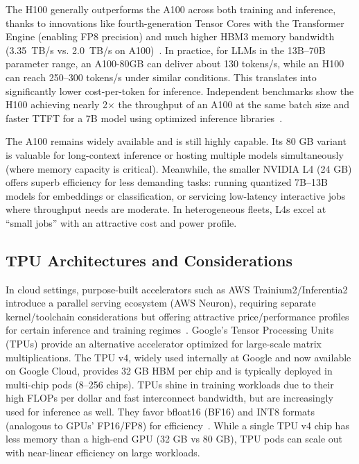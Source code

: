 The H100 generally outperforms the A100 across both training and inference, thanks to innovations like fourth-generation Tensor Cores with the Transformer Engine (enabling FP8 precision) and much higher HBM3 memory bandwidth (3.35~TB/s vs. 2.0~TB/s on A100)~\cite{nvidia-h100-arch,nvidia-a100-arch}. In practice, for LLMs in the 13B–70B parameter range, an A100-80GB can deliver about 130 tokens/s, while an H100 can reach 250–300 tokens/s under similar conditions. This translates into significantly lower cost-per-token for inference. Independent benchmarks show the H100 achieving nearly 2$\times$ the throughput of an A100 at the same batch size and faster TTFT for a 7B model using optimized inference libraries~\cite{tgi-github,vllm-pagedattention}. 

The A100 remains widely available and is still highly capable. Its 80 GB variant is valuable for long-context inference or hosting multiple models simultaneously (where memory capacity is critical). Meanwhile, the smaller NVIDIA L4 (24 GB) offers superb efficiency for less demanding tasks: running quantized 7B–13B models for embeddings or classification, or servicing low-latency interactive jobs where throughput needs are moderate. In heterogeneous fleets, L4s excel at ``small jobs'' with an attractive cost and power profile.

\subsection{TPU Architectures and Considerations}
\label{sec:infra-hardware-tpu}


In cloud settings, purpose-built accelerators such as AWS Trainium2/Inferentia2 introduce a parallel serving ecosystem (AWS Neuron), requiring separate kernel/toolchain considerations but offering attractive price/performance profiles for certain inference and training regimes~\cite{aws_trainium2_arch,aws_inferentia_overview,aws_neuron_arch_guide}.
Google’s Tensor Processing Units (TPUs) provide an alternative accelerator optimized for large-scale matrix multiplications. The TPU v4, widely used internally at Google and now available on Google Cloud, provides 32 GB HBM per chip and is typically deployed in multi-chip pods (8–256 chips). TPUs shine in training workloads due to their high FLOPs per dollar and fast interconnect bandwidth, but are increasingly used for inference as well. They favor bfloat16 (BF16) and INT8 formats (analogous to GPUs’ FP16/FP8) for efficiency~\cite{jouppi2023-tpuv4}. While a single TPU v4 chip has less memory than a high-end GPU (32 GB vs 80 GB), TPU pods can scale out with near-linear efficiency on large workloads. 

